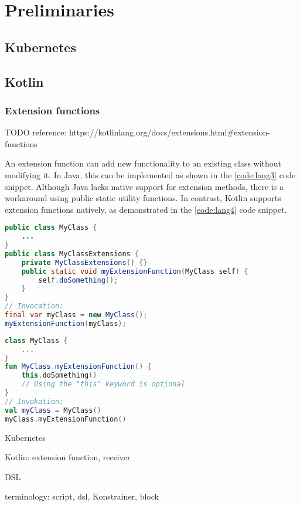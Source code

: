 \setlength{\parindent}{0pt}
\setlength{\parskip}{0.6em}

\chapter{Preliminaries}
\label{chap:prerequisites}

\section{Kubernetes}

\section{Kotlin}

\subsection{Extension functions}
\label{sec:extension}

TODO reference: https://kotlinlang.org/docs/extensions.html\#extension-functions

An extension function can add new functionality to an existing class without modifying it. In Java, this can be implemented as shown in the \ref{code:lang3} code snippet. Although Java lacks native support for extension methods, there is a workaround using public static utility functions. In contrast, Kotlin supports extension functions natively, as demonstrated in the \ref{code:lang4} code snippet.

\begin{lstlisting}[caption={Extension functions in Java},language=Java,label=code:lang3]
public class MyClass {
    ...
}
public class MyClassExtensions {
    private MyClassExtensions() {}
    public static void myExtensionFunction(MyClass self) {
        self.doSomething();
    }
}
// Invocation:
final var myClass = new MyClass();
myExtensionFunction(myClass);
\end{lstlisting}

\begin{lstlisting}[caption={Extension functions in Kotlin},language=Kotlin,label=code:lang4]
class MyClass {
    ...
}
fun MyClass.myExtensionFunction() {
    this.doSomething()
    // Using the "this" keyword is optional
}
// Invokation:
val myClass = MyClass()
myClass.myExtensionFunction()
\end{lstlisting}



Kubernetes

Kotlin: extension function, receiver

DSL

terminology: script, dsl, Konstrainer, block
